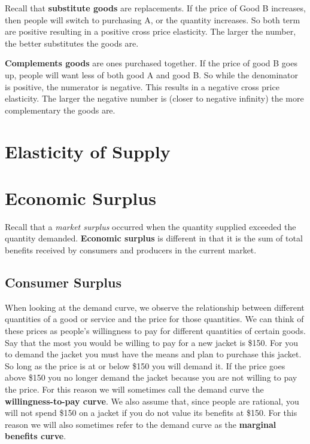 \documentclass[
]{book}
\begin{document}
Recall that \textbf{substitute goods} are replacements. If the price of Good B increases, then people will switch to purchasing A, or the quantity increases. So both term are positive resulting in a positive cross price elasticity. The larger the number, the better substitutes the goods are.

\textbf{Complements goods} are ones purchased together. If the price of good B goes up, people will want less of both good A and good B. So while the denominator is positive, the numerator is negative. This results in a negative cross price elasticity. The larger the negative number is (closer to negative infinity) the more complementary the goods are.

\section{Elasticity of Supply}\label{elasticity-of-supply}

\section{Economic Surplus}\label{economic-surplus}

Recall that a \emph{market surplus} occurred when the quantity supplied exceeded the quantity demanded. \textbf{Economic surplus} is different in that it is the sum of total benefits received by consumers and producers in the current market.

\subsection{Consumer Surplus}\label{consumer-surplus}

When looking at the demand curve, we observe the relationship between different quantities of a good or service and the price for those quantities. We can think of these prices as people's willingness to pay for different quantities of certain goods. Say that the most you would be willing to pay for a new jacket is \$150. For you to demand the jacket you must have the means and plan to purchase this jacket. So long as the price is at or below \$150 you will demand it. If the price goes above \$150 you no longer demand the jacket because you are not willing to pay the price. For this reason we will sometimes call the demand curve the \textbf{willingness-to-pay curve}. We also assume that, since people are rational, you will not spend \$150 on a jacket if you do not value its benefits at \$150. For this reason we will also sometimes refer to the demand curve as the \textbf{marginal benefits curve}.
\end{document}
